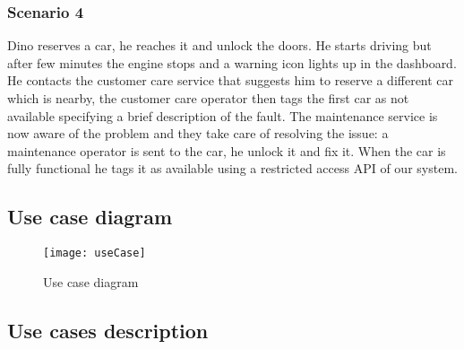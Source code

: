 \subsubsection{Scenario 4}
\label{scenario:4}
Dino reserves a car, he reaches it and unlock the doors. He starts driving but after few minutes the engine stops and a warning icon lights up in the dashboard. He contacts the customer care service that suggests him to reserve a different car which is nearby, the customer care operator then tags the first car as not available specifying a brief description of the fault. The maintenance service is now aware of the problem and they take care of resolving the issue: a maintenance operator is sent to the car, he unlock it  and fix it. When the car is fully functional he tags it as available using a restricted access API of our system.
\clearpage
\subsection{Use case diagram}

\begin{figure}[h!]
	\centering
	\texttt{[image: useCase]}
	\caption{
		\label{fig:useCase} 
		Use case diagram
	}
\end{figure}
\clearpage

\subsection{Use cases description}
